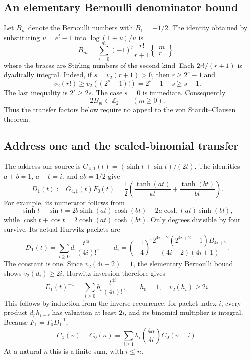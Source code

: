 \subsection{An elementary Bernoulli denominator bound}

Let $B_m$ denote the Bernoulli numbers with $B_1=-1/2$.
The identity obtained by substituting $u=e^t-1$ into
$\log(1+u)/u$ is
\begin{equation}
 B_m=\sum_{r=0}^m(-1)^r\frac{r!}{r+1}
                                  \left\{\begin{matrix}m\\r\end{matrix}\right\},
 \label{eq:bernoulli-stirling-denominator}
\end{equation}
where the braces are Stirling numbers of the second kind. Each
$2r!/(r+1)$ is dyadically integral. Indeed, if $s=v_2(r+1)>0$, then
$r\geq2^s-1$ and
\[
 v_2(r!)\geq v_2((2^s-1)!)=2^s-1-s\geq s-1.
\]
The last inequality is $2^s\geq2s$. The case $s=0$ is immediate.
Consequently
\begin{equation}
 2B_m\in\mathbb Z_2\qquad(m\geq0).
 \label{eq:elementary-bernoulli-bound}
\end{equation}
Thus the transfer factors below require no appeal to the
von Staudt--Clausen theorem.

\subsection{Address one and the scaled-binomial transfer}

The address-one source is
$G_{4,1}(t)=(\sinh t+\sin t)/(2t)$. The identities $a+b=1$,
$a-b=i$, and $ab=1/2$ give
\begin{equation}
 D_1(t):=G_{4,1}(t)F_0(t)
 =\frac12\left(\frac{\tanh(at)}{at}
                         +\frac{\tanh(bt)}{bt}\right).
 \label{eq:address-one-tangent-factor}
\end{equation}
For example, its numerator follows from
\[
 \sinh t+\sin t
 =2b\sinh(at)\cosh(bt)+2a\cosh(at)\sinh(bt),
\]
while $\cosh t+\cos t=2\cosh(at)\cosh(bt)$.
Only degrees divisible by four survive. Its actual Hurwitz packets are
\begin{equation}
 D_1(t)=\sum_{i\geq0}d_i\frac{t^{4i}}{(4i)!},\qquad
 d_i=\left(-\frac14\right)^i
 \frac{2^{4i+2}(2^{4i+2}-1)B_{4i+2}}{(4i+2)(4i+1)}.
 \label{eq:address-one-packets}
\end{equation}
The constant is one. Since $v_2(4i+2)=1$, the elementary Bernoulli bound
shows $v_2(d_i)\geq2i$. Hurwitz inversion therefore gives
\[
 D_1(t)^{-1}=\sum_{i\geq0}h_i\frac{t^{4i}}{(4i)!},
 \qquad h_0=1,\quad v_2(h_i)\geq2i.
\]
This follows by induction from the inverse recurrence: for packet index
$i$, every product $d_rh_{i-r}$ has valuation at least $2i$, and its
binomial multiplier is integral.
Because $F_1=F_0D_1^{-1}$,
\begin{equation}
 C_1(n)-C_0(n)
     =\sum_{i\geq1}h_i\binom{4n}{4i}C_0(n-i).
 \label{eq:address-one-exact-transfer}
\end{equation}
At a natural $n$ this is a finite sum, with $i\leq n$.

